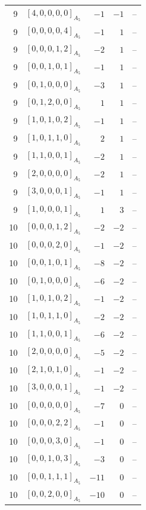 \documentclass[11pt]{article}
\newcommand{\Dynkin}[1]{#1}
\begin{document}
\begin{longtable}{r l r r l}
9 & $\Dynkin{[4,0,0,0,0]_{A_5}}$ & $-1$ & $-1$ & --\\
9 & $\Dynkin{[0,0,0,0,4]_{A_5}}$ & $-1$ & $1$ & --\\
9 & $\Dynkin{[0,0,0,1,2]_{A_5}}$ & $-2$ & $1$ & --\\
9 & $\Dynkin{[0,0,1,0,1]_{A_5}}$ & $-1$ & $1$ & --\\
9 & $\Dynkin{[0,1,0,0,0]_{A_5}}$ & $-3$ & $1$ & --\\
9 & $\Dynkin{[0,1,2,0,0]_{A_5}}$ & $1$ & $1$ & --\\
9 & $\Dynkin{[1,0,1,0,2]_{A_5}}$ & $-1$ & $1$ & --\\
9 & $\Dynkin{[1,0,1,1,0]_{A_5}}$ & $2$ & $1$ & --\\
9 & $\Dynkin{[1,1,0,0,1]_{A_5}}$ & $-2$ & $1$ & --\\
9 & $\Dynkin{[2,0,0,0,0]_{A_5}}$ & $-2$ & $1$ & --\\
9 & $\Dynkin{[3,0,0,0,1]_{A_5}}$ & $-1$ & $1$ & --\\
9 & $\Dynkin{[1,0,0,0,1]_{A_5}}$ & $1$ & $3$ & --\\
10 & $\Dynkin{[0,0,0,1,2]_{A_5}}$ & $-2$ & $-2$ & --\\
10 & $\Dynkin{[0,0,0,2,0]_{A_5}}$ & $-1$ & $-2$ & --\\
10 & $\Dynkin{[0,0,1,0,1]_{A_5}}$ & $-8$ & $-2$ & --\\
10 & $\Dynkin{[0,1,0,0,0]_{A_5}}$ & $-6$ & $-2$ & --\\
10 & $\Dynkin{[1,0,1,0,2]_{A_5}}$ & $-1$ & $-2$ & --\\
10 & $\Dynkin{[1,0,1,1,0]_{A_5}}$ & $-2$ & $-2$ & --\\
10 & $\Dynkin{[1,1,0,0,1]_{A_5}}$ & $-6$ & $-2$ & --\\
10 & $\Dynkin{[2,0,0,0,0]_{A_5}}$ & $-5$ & $-2$ & --\\
10 & $\Dynkin{[2,1,0,1,0]_{A_5}}$ & $-1$ & $-2$ & --\\
10 & $\Dynkin{[3,0,0,0,1]_{A_5}}$ & $-1$ & $-2$ & --\\
10 & $\Dynkin{[0,0,0,0,0]_{A_5}}$ & $-7$ & $0$ & --\\
10 & $\Dynkin{[0,0,0,2,2]_{A_5}}$ & $-1$ & $0$ & --\\
10 & $\Dynkin{[0,0,0,3,0]_{A_5}}$ & $-1$ & $0$ & --\\
10 & $\Dynkin{[0,0,1,0,3]_{A_5}}$ & $-3$ & $0$ & --\\
10 & $\Dynkin{[0,0,1,1,1]_{A_5}}$ & $-11$ & $0$ & --\\
10 & $\Dynkin{[0,0,2,0,0]_{A_5}}$ & $-10$ & $0$ & --\\

\end{longtable}
\end{document}
